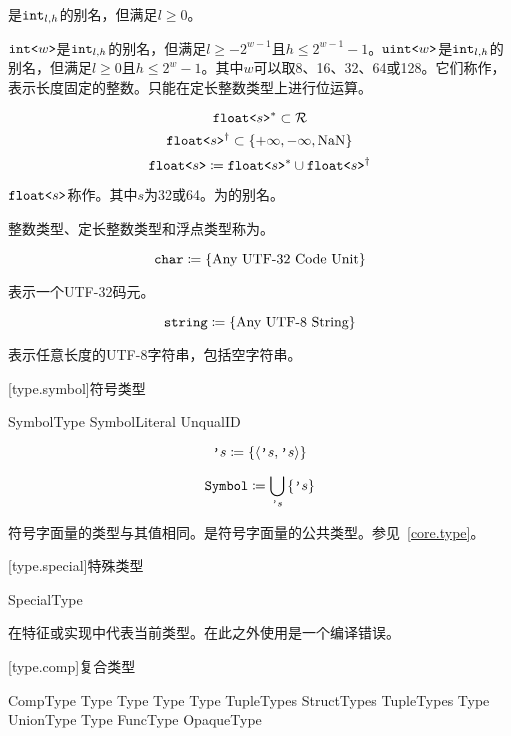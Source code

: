 是$\texttt{int}_{l,h}$的别名，但满足$l\ge0$。

\pnum
$\texttt{int<}w\texttt{>}$是$\texttt{int}_{l,h}$的别名，但满足$l\ge-2^{w-1}$且$h\le2^{w-1}-1$。$\texttt{uint<}w\texttt{>}$是$\texttt{int}_{l,h}$的别名，但满足$l\ge0$且$h\le2^w-1$。其中$w$可以取8、16、32、64或128。它们称作，表示长度固定的整数。只能在定长整数类型上进行位运算。

$$ \texttt{float<}s\texttt{>}^\ast \subset \mathcal{R} $$
$$ \texttt{float<}s\texttt{>}^\dagger \subset \{ +\infty, -\infty, \mathrm{NaN} \} $$
$$ \texttt{float<}s\texttt{>} \coloneqq \texttt{float<}s\texttt{>}^\ast \cup \texttt{float<}s\texttt{>}^\dagger $$

\pnum
$\texttt{float<}s\texttt{>}$称作。其中$s$为32或64。为的别名。

\pnum
整数类型、定长整数类型和浮点类型称为。

$$\texttt{char} \coloneqq \left\{ \textnormal{Any UTF-32 Code Unit} \right\}$$

\pnum
{}表示一个UTF-32码元。

$$\texttt{string} \coloneqq \left\{ \textnormal{Any UTF-8 String} \right\} $$

\pnum
{}表示任意长度的UTF-8字符串，包括空字符串。

[type.symbol]{符号类型}

\begin{bnf}{SymbolType}
    SymbolLiteral \br
     UnqualID \terminal{)}
\end{bnf}

$$ \texttt{'}s \coloneqq \left\{ \langle \texttt{'}s, \texttt{'}s \rangle \right\} $$

$$ \texttt{Symbol} \coloneqq \bigcup_{\texttt{'}s} \left\{  \texttt{'}s \right\} $$

\pnum
符号字面量的类型与其值相同。是符号字面量的公共类型。参见~\ref{core.type}。

[type.special]{特殊类型}

\begin{bnf}{SpecialType}
\end{bnf}

\pnum
{}在特征或实现中代表当前类型。在此之外使用是一个编译错误。

[type.comp]{复合类型}

\begin{bnf}{CompType}
    Type  \br
    Type \terminal{[} \terminal{]} \br
    Type \terminal{[} Type \terminal{]} \br
    \terminal{(} TupleTypes\bnfs \terminal{)} \br
    \terminal{\{} StructTypes \terminal{\}} \br
    \terminal{(} TupleTypes\bnfs \terminal{)} \terminal{->} Type \br
    UnionType \br
    Type \terminal{\&} \br
    FuncType \br
    OpaqueType
\end{bnf}


